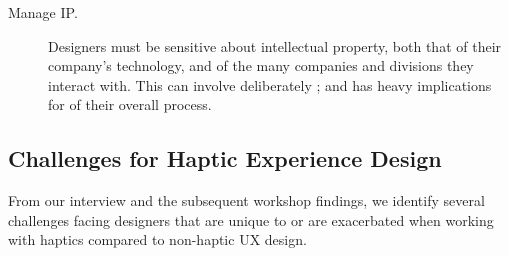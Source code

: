 \begin{description}
    \item[Manage IP.]
    Designers must be sensitive about intellectual property, both that of their company's technology, and of the many companies and divisions they interact with. This can involve deliberately ; and has heavy implications for  of their overall process.

\end{description}




\subsection{Challenges for Haptic Experience Design}
\noindent
%
From our interview and the subsequent workshop findings, 
we identify several challenges facing designers that are unique to \haxd or are exacerbated when working with haptics compared to non-haptic UX design. 





